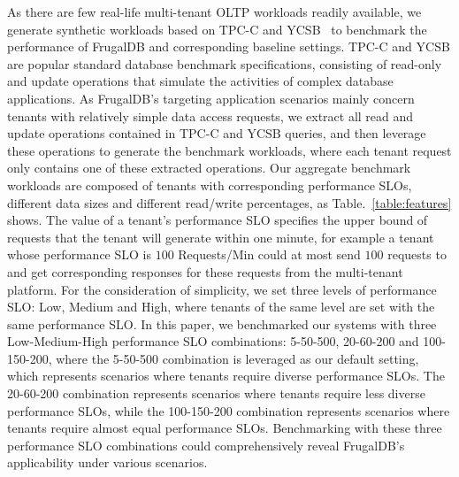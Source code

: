 As there are few real-life multi-tenant OLTP workloads readily available, we generate synthetic workloads based on TPC-C and YCSB~\cite{YCSB} to benchmark the performance of FrugalDB and corresponding baseline settings. TPC-C and YCSB are popular standard database benchmark specifications, consisting of read-only and update operations that simulate the activities of complex database applications.
As FrugalDB's targeting application scenarios mainly concern tenants with relatively simple data access requests, we extract all read and update operations contained in TPC-C and YCSB queries, and then leverage these operations to generate the benchmark workloads, where each tenant request only contains one of these extracted operations. Our aggregate benchmark workloads are composed of tenants with corresponding performance SLOs, different data sizes and different read/write percentages, as Table.~\ref{table:features} shows. The value of a tenant's performance SLO specifies the upper bound of requests that the tenant will generate within one minute, for example a tenant whose performance SLO is $100$ Requests/Min could at most send $100$ requests to and get corresponding responses for these requests from the multi-tenant platform. For the consideration of simplicity, we set three levels of performance SLO: Low, Medium and High, where tenants of the same level are set with the same performance SLO. In this paper, we benchmarked our systems with three Low-Medium-High performance SLO combinations: 5-50-500, 20-60-200 and 100-150-200, where the 5-50-500 combination is leveraged as our default setting, which represents scenarios where tenants require diverse performance SLOs. The 20-60-200 combination represents scenarios where tenants require less diverse performance SLOs, while the 100-150-200 combination represents scenarios where tenants require almost equal performance SLOs. Benchmarking with these three performance SLO combinations could comprehensively reveal FrugalDB's applicability under various scenarios.

